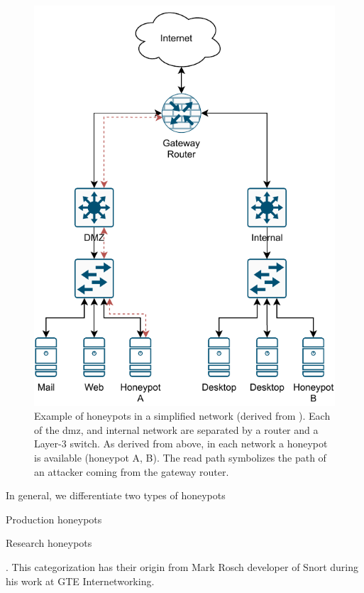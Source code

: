 \begin{figure}[ht]
    \centering
    \includegraphics{figures/honeypot-example.pdf}
    \caption[Example of honeypots in a simplified network]{Example of honeypots in a simplified network (derived from \cite{Spitzner2003}). Each of the \ac{dmz}, and internal network are separated by a router and a Layer-3 switch. As derived from above, in each network a honeypot is available (honeypot A, B). The read path symbolizes the path of an attacker coming from the gateway router.}
    \label{fig:honeypot-example}
\end{figure}

In general, we differentiate two types of honeypots
\begin{enumerate*}[label=(\roman*)]
    \item Production honeypots
    \item Research honeypots
\end{enumerate*}.
This categorization has their origin from Mark Rosch developer of Snort during his work at GTE Internetworking.

